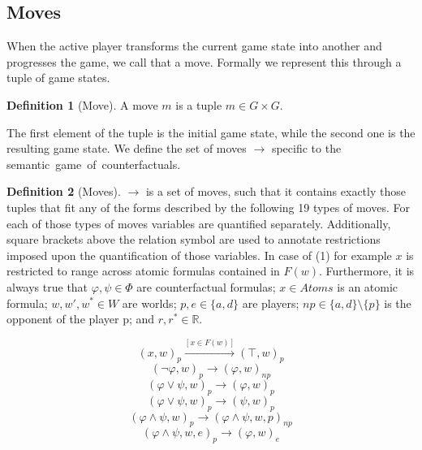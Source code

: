 \documentclass[a4paper,american]{paper}
\theoremstyle{definition}\newtheorem{definition}{Definition}
\begin{document}
\subsection{Moves}
When the active player transforms the current game state into another and progresses the game, we call that a move. Formally we represent this through a tuple of game states.
\begin{definition}[Move]
A move $m$ is a tuple $m\in G\times G$.
\end{definition}
\noindent The first element of the tuple is the initial game state, while the second one is the resulting game state. We define the set of moves $\rightarrow$ specific to the semantic~game~of~counterfactuals.
\begin{definition}[Moves]\label{def:set_moves}
$\rightarrow$ is a set of moves, such that it contains exactly those tuples that fit any of the forms described by the following 19 types of moves. For each of those types of moves variables are quantified separately. Additionally, square brackets above the relation symbol are used to annotate restrictions imposed upon the quantification of those variables. In case of (1) for example $x$ is restricted to range across atomic formulas contained in $F(w)$. Furthermore, it is always true that $\varphi ,\psi\in\Phi$ are counterfactual formulas; $x\in Atoms$ is an atomic formula; $w,w',w^*\in W$ are worlds; $p,e\in\{ a,d\}$ are players; $np\in\{ a,d\}\setminus{}\{ p\}$ is the opponent of the player p; and $r,r^*\in\mathbb{R}$.
\begin{figure}[H]
	\centering
	\begin{equation}
		(x ,w)_{p}\xrightarrow{[x\in F(w)]} (\top ,w)_{p}
	\end{equation}
	\begin{equation}
		(\neg\varphi ,w)_{p}\rightarrow (\varphi ,w)_{np}
	\end{equation}
	\begin{equation}
		(\varphi\vee\psi ,w)_{p}\rightarrow (\varphi ,w)_{p}
	\end{equation}
	\begin{equation}
		(\varphi\vee\psi ,w)_{p}\rightarrow (\psi ,w)_{p}
	\end{equation}
	\begin{equation}
		(\varphi\wedge\psi ,w)_{p}\rightarrow (\varphi\wedge\psi ,w,p)_{np}
	\end{equation}
	\begin{equation}
		(\varphi\wedge\psi ,w,e)_{p}\rightarrow (\varphi ,w)_{e}
	\end{equation}

\end{figure}
\end{definition}
\end{document}
